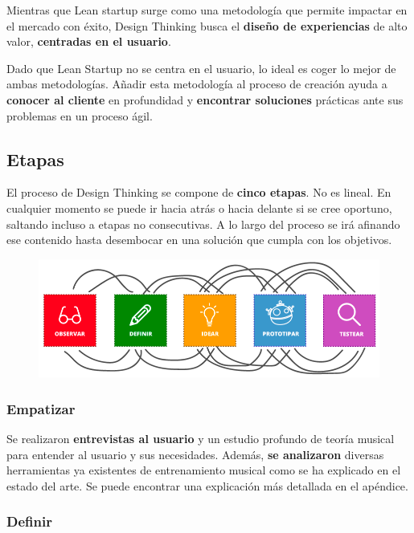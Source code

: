 \documentclass[12pt,twoside,titlepage]{report}
\begin{document}
Mientras que Lean startup surge como una metodología que permite impactar en el mercado con éxito, Design Thinking busca el \textbf{diseño de experiencias} de alto valor, \textbf{centradas en el usuario}.

Dado que Lean Startup no se centra en el usuario, lo ideal es coger lo mejor de ambas metodologías. Añadir esta metodología al proceso de creación ayuda a \textbf{conocer al cliente} en profundidad y \textbf{encontrar soluciones} prácticas ante sus problemas en un proceso ágil.

\subsection{Etapas}

El proceso de Design Thinking se compone de \textbf{cinco etapas}. No es lineal. En cualquier momento se puede ir hacia atrás o hacia delante si se cree oportuno, saltando incluso a etapas no consecutivas. A lo largo del proceso se irá afinando ese contenido hasta desembocar en una solución que cumpla con los objetivos. 

\begin{figure}[H] 
    \includegraphics[scale=0.44]{Design Thinking/Etapas}
    \centering
    \label{fig:Design Thinking}
\end{figure}

\subsubsection{Empatizar}

Se realizaron \textbf{entrevistas al usuario} y un estudio profundo de teoría musical para entender al usuario y sus necesidades. Además, \textbf{se analizaron} diversas herramientas ya existentes de entrenamiento musical como se ha explicado en el estado del arte. Se puede encontrar una explicación más detallada en el apéndice.

\subsubsection{Definir}
\end{document}
